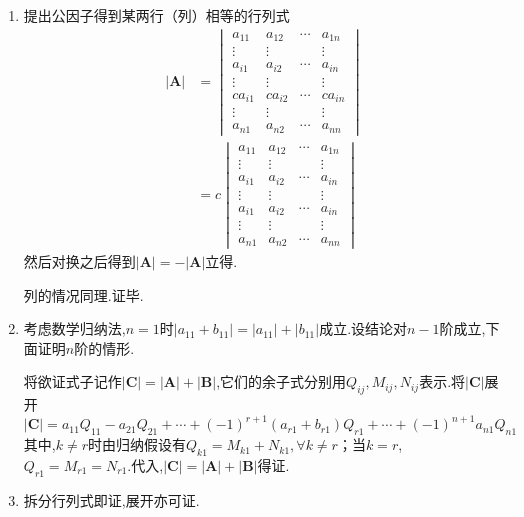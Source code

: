\begin{formal}
\begin{Proof}
\begin{enumerate}[label = {\textup{(\arabic*)}}]
\item 提出公因子得到某两行（列）相等的行列式\begin{align*}
    \left|\bm{A}\right|&=\begin{vmatrix}
        a_{11}&a_{12}&\cdots&a_{1n}\\
        \vdots&\vdots& &\vdots\\
        a_{i1}&a_{i2}&\cdots&a_{in}\\
        \vdots&\vdots& &\vdots\\
        ca_{i1}&ca_{i2}&\cdots&ca_{in}\\
        \vdots&\vdots& &\vdots\\
        a_{n1}&a_{n2}&\cdots&a_{nn}
    \end{vmatrix}\\
    &=c\begin{vmatrix}
        a_{11}&a_{12}&\cdots&a_{1n}\\
        \vdots&\vdots& &\vdots\\
        a_{i1}&a_{i2}&\cdots&a_{in}\\
        \vdots&\vdots& &\vdots\\
        a_{i1}&a_{i2}&\cdots&a_{in}\\
        \vdots&\vdots& &\vdots\\
        a_{n1}&a_{n2}&\cdots&a_{nn}
    \end{vmatrix}
\end{align*}
\vfill
然后对换之后得到$\left|\bm{A}\right|=-\left|\bm{A}\right|$立得.

列的情况同理.证毕.
\item 考虑数学归纳法,$n=1$时$\left|a_{11}+b_{11}\right|=\left|a_{11}\right|+\left|b_{11}\right|$成立.设结论对$n-1$阶成立,下面证明$n$阶的情形.

将欲证式子记作$\left|\bm{C}\right|=\left|\bm{A}\right|+\left|\bm{B}\right|$,它们的余子式分别用$Q_{ij},M_{ij},N_{ij}$表示.将$\left|\bm{C}\right|$展开
\[
\left|\bm{C}\right|=a_{11}Q_{11}-a_{21}Q_{21}+\cdots+\left(-1\right)^{r+1}\left(a_{r1}+b_{r1}\right)Q_{r1}+\cdots+\left(-1\right)^{n+1}a_{n1}Q_{n1}
\]其中,$k\neq r$时由归纳假设有$Q_{k1}=M_{k1}+N_{k1},\forall k\neq r$；当$k=r$,$Q_{r1}=M_{r1}=N_{r1}.$代入,$\left|\bm{C}\right|=\left|\bm{A}\right|+\left|\bm{B}\right|$得证.

\item 拆分行列式即证,展开亦可证.\qedhere
\end{enumerate}
\end{Proof}
\end{formal}
